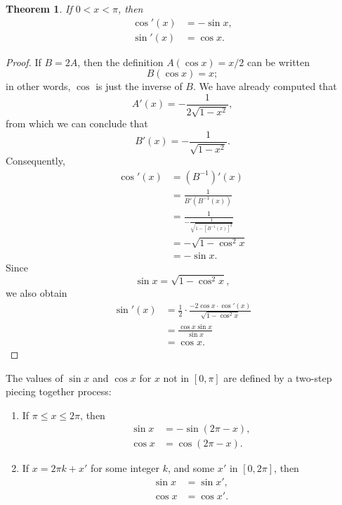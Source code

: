 \documentclass{article}
\newtheorem{theorem}{Theorem}
\begin{document}
\begin{theorem}
  If $0 < x < \pi$, then \begin{align*}
    \cos'(x) &= -\sin x, \\
    \sin'(x) &= \cos x.
  \end{align*}
\end{theorem}

\begin{proof}
  If $B = 2A$, then the definition $A(\cos x) = x/2$ can be written
  \begin{equation*}
    B(\cos x) = x;
  \end{equation*} in other words, $\cos$ is just the inverse of $B$. We have
  already computed that \begin{equation*}
    A'(x) = -\frac{1}{2\sqrt{1 - x^2}},
  \end{equation*} from which we can conclude that \begin{equation*}
    B'(x) = -\frac{1}{\sqrt{1 - x^2}}.
  \end{equation*} Consequently, \begin{align*}
    \cos'(x)
      &= (B^{-1})'(x) \\
      &= \frac{1}{B'(B^{-1}(x))} \\
      &= \frac{1}{-\frac{1}{\sqrt{1 - [B^{-1}(x)]^2}}} \\
      &= -\sqrt{1 - \cos^2 x} \\
      &= -\sin x.
  \end{align*} Since \begin{equation*}
    \sin x = \sqrt{1 - \cos^2 x},
  \end{equation*} we also obtain \begin{align*}
    \sin'(x)
      &= \frac{1}{2} \cdot \frac{-2\cos x \cdot \cos'(x)}{\sqrt{1 - \cos^2 x}}
      \\
      &= \frac{\cos x \sin x}{\sin x} \\
      &= \cos x.
  \end{align*}
\end{proof}

The values of $\sin x$ and $\cos x$ for $x$ not in $[0, \pi]$ are defined by a
two-step piecing together process: \begin{enumerate}
  \item If $\pi \leq x \leq 2\pi$, then \begin{align*}
      \sin x &= -\sin(2\pi - x), \\
      \cos x &= \cos(2\pi - x).
    \end{align*}
  \item If $x = 2\pi k + x'$ for some integer $k$, and some $x'$ in $[0,
    2\pi]$, then \begin{align*}
      \sin x &= \sin x', \\
      \cos x &= \cos x'.
    \end{align*}
\end{enumerate}
\end{document}
